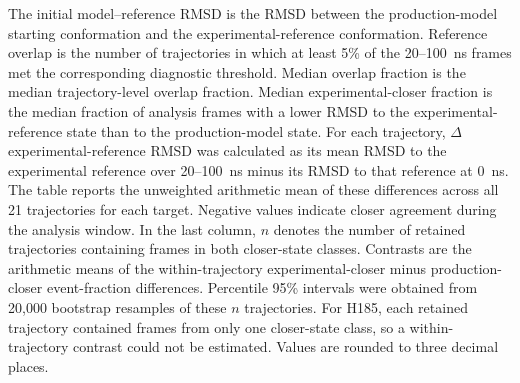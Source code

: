 \begin{table}[H]
  \vspace{4pt}
  \parbox{\linewidth}{\footnotesize
  The initial model--reference RMSD is the RMSD between the production-model
  starting conformation and the experimental-reference conformation. Reference
  overlap is the number of trajectories in which
  at least 5\% of the 20--100~ns frames met the corresponding diagnostic
  threshold. Median overlap fraction is the median trajectory-level overlap
  fraction. Median experimental-closer fraction is the median fraction of
  analysis frames with a lower RMSD to the experimental-reference state than
  to the production-model state.
  For each trajectory, $\Delta$ experimental-reference RMSD was calculated as its
  mean RMSD to the experimental reference over 20--100~ns minus its RMSD to that
  reference at 0~ns. The table reports the unweighted arithmetic mean of these
  differences across all 21 trajectories for each target. Negative values
  indicate closer agreement during the analysis window.
  In the last column, $n$ denotes the number of retained trajectories containing
  frames in both closer-state classes. Contrasts are the arithmetic means of
  the within-trajectory experimental-closer minus production-closer event-fraction
  differences. Percentile 95\% intervals were obtained from 20,000 bootstrap
  resamples of these $n$ trajectories.
  For H185, each retained trajectory contained frames from only one closer-state
  class, so a within-trajectory contrast could not be estimated.
  Values are rounded to three decimal places.}
\end{table}
